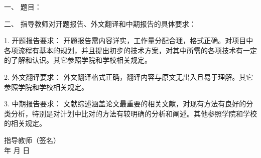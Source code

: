 \newpage

\thispagestyle{empty}

{
\setlength{\parindent}{0em}
\renewcommand{\baselinestretch}{2}
\songti\sihao\bfseries

一、 \; 题目： \; \underline{\makebox[24em]{\zjutitlec}}

\vspace{2em}

二、 \; 指导教师对开题报告、外文翻译和中期报告的具体要求：

1. \; 开题报告要求： \; 开题报告需内容详实，工作量分配合理，格式正确。对项目中各项流程有基本的规划，并且提出初步的技术方案，对其中所需的各项技术有一定的了解和认识。其它参照学院和学校相关规定。

2. \; 外文翻译要求： \; 外文翻译格式正确，翻译内容与原文无出入且易于理解。其它参照学院和学校相关规定。

3. \; 中期报告要求： \; 文献综述涵盖论文最重要的相关文献，对现有方法有良好的分类分析，特别是对计划中比对的方法有较明确的分析和阐述。其他参照学院和学校的相关规定。

\vspace{8cm}
}

{
\songti\xiaosi\bfseries
\begin{flushright}
  指导教师（签名） \; \underline{\hspace{6em}} \\
  年 \qquad 月 \qquad 日
\end{flushright}
}

